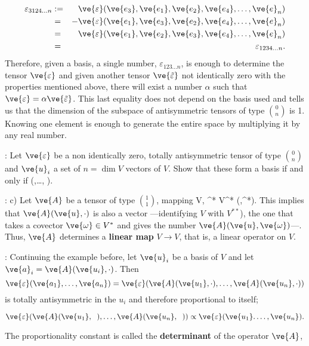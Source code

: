 \begin{eqnarray*} 
\varepsilon_{3124\ldots n} &:=& \ve{\varepsilon}(\ve{e_3},\ve{e_1}, \ve{e_{2}}, \ve{e_{4}},\ldots,\ve{e}_n) \\
&=& -\ve{\varepsilon}(\ve{e_1},\ve{e_3}, \ve{e_{2}}, \ve{e_{4}},\ldots,\ve{e}_n) \\ 
&=& \ve{\varepsilon}(\ve{e_1},\ve{e_2}, \ve{e_{3}}, \ve{e_{4}},\ldots,\ve{e}_n) \\
&=&\varepsilon_{1234\ldots n}. 
\end{eqnarray*} 
% 
Therefore, given a basis, a single number, $\varepsilon_{123\ldots n}$, is enough to determine the tensor $\ve{\varepsilon}$ and given another tensor $\ve{\tilde{\varepsilon} }$ not identically zero with the properties mentioned above, there will exist a number $\alpha$ such that $\ve{\varepsilon} = \alpha\ve{\tilde{\varepsilon}}$. 
This last equality does not depend on the basis used and tells us that the dimension of the subspace of antisymmetric tensors of type ${0 \choose n}$ is 1. Knowing one element is enough to generate the entire space by multiplying it by any real number.

\ejer: Let $\ve{\varepsilon}$ be a non identically zero, totally antisymmetric tensor of type ${0 \choose n}$ and ${\ve{u}_i}$ a set of $n=\dim V$ vectors of $V$. Show that these form a basis if and only if 
\beq 
\ve{\varepsilon} (,\ldots, ). 
\eeq

\ejem: c) Let $\ve{ A}$ be a tensor of type ${1 \choose 1}$, mapping
\beq
{}\in V, \;\; ^* \in V^* \to {}(,^*)\in\re. 
\eeq 
This implies that $\ve{A}(\ve{u},\cdot)$ is also a vector ---identifying $V$ with $V^{**}$), the one that takes a covector $\ve{\omega} \in V^*$ and gives the number $\ve{A}(\ve{u},\ve{\omega})$---. 
Thus, $\ve{A}$ determines a \textbf{linear map} $V \to V$, that is, a linear operator on $V$.

\ejer: Continuing the example before, let ${\ve{u}_i}$ be a basis of $V$ and let $\ve{ a}_i = \ve{A}(\ve{u_i},\cdot)$. Then \[ \ve{\varepsilon}(\ve{a_1},\ldots,\ve{a_n})=\ve{\varepsilon}(\ve{A}(\ve{u_1}, \cdot),\ldots ,\ve{A}(\ve{u_n},\cdot)) \] is totally antisymmetric in the ${u_i}$ and therefore proportional to itself;

\[ 
\ve{\varepsilon}(\ve{A}(\ve{u_1},\;\;),\ldots ,\ve{A}(\ve{u_n},\;\;)) \propto \ve{\varepsilon}(\ve{u_1}. \ldots, \ve{u_n}). 
\] %

The proportionality constant is called the {\bf determinant}  of the operator $\ve{A}$,

